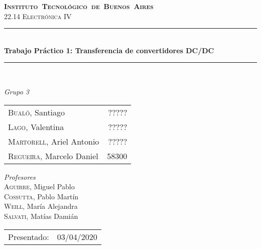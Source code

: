 \begin{titlepage}
\newcommand{\HRule}{\rule{\linewidth}{0.5mm}}
\center
\mbox{\textsc{\LARGE \bfseries {Instituto Tecnol\'ogico de Buenos Aires}}}\\[1.5cm]
\textsc{\Large 22.14 Electrónica IV}\\[0.5cm]


\HRule \\[0.6cm]
{ \Huge \bfseries Trabajo Pr\'actico 1: Transferencia de convertidores DC/DC}\\[0.4cm] %
\HRule \\[1.5cm]


{\large

\emph{Grupo 3}\\
\vspace{3px}

\begin{tabular}{lr} 	
\textsc{Bualó}, Santiago  & ????? \\
\textsc{Lago}, Valentina  & ????? \\
\textsc{Martorell}, Ariel Antonio & ????? \\
\textsc{Regueira}, Marcelo Daniel  & 58300 \\
\end{tabular}

\vspace{20px}

\emph{Profesores}\\
\vspace{3px}
\textsc{Aguirre}, Miguel Pablo\\ 	
\textsc{Cossutta}, Pablo Martín\\ 	
\textsc{Weill}, María Alejandra\\ 	
\textsc{Salvati}, Matías Damián\\ 	

\vspace{100px}

\begin{tabular}{ll}

Presentado: & 03/04/2020\\

\end{tabular}

}

\vfill

\end{titlepage}